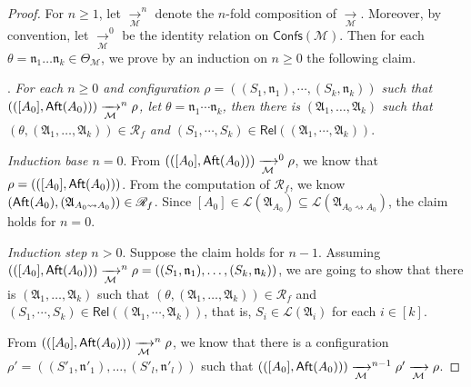 \documentclass[preprint,12pt]{elsarticle}
\newcommand\Mm{{\mathcal{M} }}
\newcommand\aft{{\sf Aft}}
\newcommand\confs{{\mathsf{Confs} }}
\newcommand\aname{\mathfrak{n}}
\newcommand\AutReach{\mathscr{R}}
\newcommand\Rel{\mathsf{Rel}}
\newcommand\Aut{{\mathfrak{A} }}
\newcommand\Lang{{\mathscr{L} }}
\newcommand\ConfSet{{\mathscr{C} }}
\begin{document}
\begin{proof}
    For $n \ge 1$, let $\xrightarrow[\Mm]{}^n$ denote the $n$-fold composition of $\xrightarrow[\Mm]{}$. Moreover, by convention, let $\xrightarrow[\Mm]{}^0$ be the identity relation on $\confs(\Mm)$. 
    Then for each $\theta = \aname_1 \dots \aname_k \in \Theta_\Mm$, we prove by an induction on $n \ge 0$ the following claim.
    
    \smallskip
    
    . \emph{For each $n \ge 0$ and configuration $\rho =  ((S_1, \aname_1), \cdots, (S_k, \aname_k))$ such that 
    $(([A_0], \aft(A_0))) \xrightarrow[\Mm]{}^n \rho$, let $\theta = \aname_1 \cdots \aname_k$, then  
    there is  $(\Aut_1, \dots, \Aut_k)$ such that $(\theta, (\Aut_1, \dots, \Aut_k)) \in \AutReach_f$ and $(S_1, \cdots, S_k) \in \Rel((\Aut_1,\cdots, \Aut_k))$}.   
    
    
    \smallskip
    
    \noindent \emph{Induction base $n = 0$}. From $(([A_0], \aft(A_0))) \xrightarrow[\Mm]{}^0 \rho$, we know that $\rho = (([A_0], \aft(A_0)))$. From the computation of $\AutReach_f$, we know $(\aft(A_0), (\Aut_{A_0\rightsquigarrow A_0})) \in \AutReach_f$. Since $[A_0] \in \Lang(\Aut_{A_0})\subseteq\Lang(\Aut_{A_0\rightsquigarrow A_0})$, the claim holds for $n = 0$. 
    
    \smallskip
    
    \noindent \emph{Induction step $n > 0$}. Suppose the claim holds for $n-1$. Assuming $(([A_0], \aft(A_0))) \xrightarrow[\Mm]{}^n \rho =  ((S_1, \aname_1), \dots, (S_k, \aname_k))$, we are going to show that there is  $(\Aut_1, \dots, \Aut_k)$ such that $(\theta, (\Aut_1, \dots, \Aut_k)) \in \AutReach_f$ and $(S_1, \cdots, S_k) \in \Rel((\Aut_1,\cdots, \Aut_k))$, that is, $S_i \in \Lang(\Aut_i)$ for each $i \in [k]$. 
    
    From $(([A_0], \aft(A_0))) \xrightarrow[\Mm]{}^n \rho$,  we know that there is a configuration $\rho' = ((S'_1, \aname'_1), \dots, (S'_l, \aname'_l))$ such that $(([A_0], \aft(A_0))) \xrightarrow[\Mm]{}^{n-1} \rho' \xrightarrow[\Mm]{} \rho$.
    

\end{proof}
\end{document}
